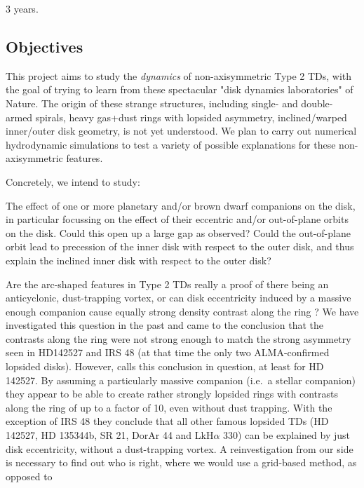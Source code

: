 \documentclass[10pt,fleqn,twoside]{article}
\begin{document}
3 years.

\subsection{Objectives}
This project aims to study the {\em dynamics} of non-axisymmetric Type 2
TDs, with the goal of trying to learn from these spectacular "disk dynamics
laboratories" of Nature. The origin of these strange structures, including
single- and double-armed spirals, heavy gas+dust rings with lopsided
asymmetry, inclined/warped inner/outer disk geometry, is not yet understood.
We plan to carry out numerical hydrodynamic simulations to test a variety of
possible explanations for these non-axisymmetric features. 

Concretely, we intend to study:
\begin{compactenumerate}
\item The effect of one or more planetary and/or brown dwarf companions on
  the disk, in particular focussing on the effect of their eccentric and/or
  out-of-plane orbits on the disk. Could this open up a large gap as
  observed? Could the out-of-plane orbit lead to precession of the inner
  disk with respect to the outer disk, and thus explain the inclined inner
  disk with respect to the outer disk? 
\item Are the arc-shaped features in Type 2 TDs really a proof of there
  being an anticyclonic, dust-trapping vortex, or can disk eccentricity
  induced by a massive enough companion cause equally strong density
  contrast along the ring \citep[see e.g.][]{2006A&A...447..369K}? We have
  investigated this question in the past \citep{2013A&A...553L...3A} and
  came to the conclusion that the contrasts along the ring were not strong
  enough to match the strong asymmetry seen in HD142527 and IRS 48 (at that
  time the only two ALMA-confirmed lopsided disks). However,
  \citet{2017MNRAS.464.1449R} calls this conclusion in question, at least
  for HD 142527. By assuming a particularly massive companion (i.e.~a
  stellar companion) they appear to be able to create rather strongly
  lopsided rings with contrasts along the ring of up to a factor of 10, even
  without dust trapping. With the exception of IRS 48 they conclude that all
  other famous lopsided TDs (HD 142527, HD 135344b, SR 21, DorAr 44 and
  LkH$\alpha$ 330) can be explained by just disk eccentricity, without a
  dust-trapping vortex. A reinvestigation from our side is necessary to find
  out who is right, where we would use a grid-based method, as opposed to

\end{compactenumerate}
\end{document}
